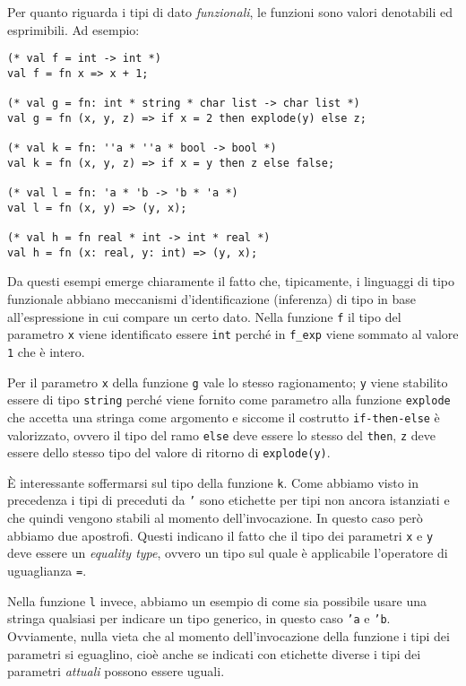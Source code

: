 \documentclass[12pt, a4paper]{report}
\theoremstyle{definition}
\newcommand{\code}[1]{\texttt{#1}}
\begin{document}
Per quanto riguarda i tipi di dato \emph{funzionali}, le funzioni sono valori
denotabili ed esprimibili. Ad esempio:
\begin{lstlisting}
(* val f = int -> int *)
val f = fn x => x + 1;

(* val g = fn: int * string * char list -> char list *)
val g = fn (x, y, z) => if x = 2 then explode(y) else z;

(* val k = fn: ''a * ''a * bool -> bool *)
val k = fn (x, y, z) => if x = y then z else false;

(* val l = fn: 'a * 'b -> 'b * 'a *)
val l = fn (x, y) => (y, x);

(* val h = fn real * int -> int * real *)
val h = fn (x: real, y: int) => (y, x);
\end{lstlisting}

Da questi esempi emerge chiaramente il fatto che, tipicamente, i linguaggi di
tipo funzionale abbiano meccanismi d'identificazione (inferenza) di tipo in base
all'espressione in cui compare un certo dato. Nella funzione \code{f} il tipo
del parametro \code{x} viene identificato essere \code{int} perché in
\code{f\_exp} viene sommato al valore \code{1} che è intero.

Per il parametro \code{x} della funzione \code{g} vale lo stesso ragionamento;
\code{y} viene stabilito essere di tipo \code{string} perché viene fornito come
parametro alla funzione \code{explode} che accetta una stringa come argomento
e siccome il costrutto \code{if-then-else} è valorizzato, ovvero il tipo del
ramo \code{else} deve essere lo stesso del \code{then}, \code{z} deve
essere dello stesso tipo del valore di ritorno di \code{explode(y)}.

È interessante soffermarsi sul tipo della funzione \code{k}. Come abbiamo visto
in precedenza i tipi di preceduti da \code{'} sono etichette per tipi non ancora
istanziati e che quindi vengono stabili al momento dell'invocazione. In questo
caso però abbiamo due apostrofi. Questi indicano il fatto che il tipo dei parametri
\code{x} e \code{y} deve essere un \emph{equality type}, ovvero un tipo sul quale
è applicabile l'operatore di uguaglianza \code{=}.

Nella funzione \code{l} invece, abbiamo un esempio di come sia possibile usare
una stringa qualsiasi per indicare un tipo generico, in questo caso \code{'a} e
\code{'b}. Ovviamente, nulla vieta che al momento dell'invocazione della funzione
i tipi dei parametri si eguaglino, cioè anche se indicati con etichette diverse
i tipi dei parametri \emph{attuali} possono essere uguali.
\end{document}
